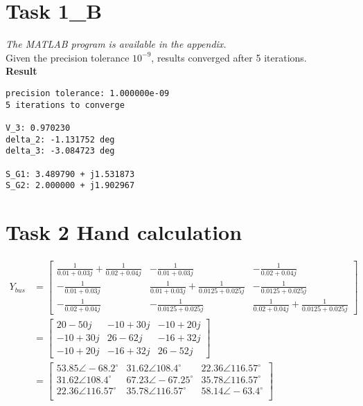 \documentclass{article}
\begin{document}
\newpage


\section*{Task 1\_B}
\textit{The MATLAB program is available in the appendix.}\\

Given the precision tolerance $10^{-9}$, results converged after 5 iterations.\\

\textbf{Result}
\begin{lstlisting}[language={}]
precision tolerance: 1.000000e-09
5 iterations to converge

V_3: 0.970230
delta_2: -1.131752 deg
delta_3: -3.084723 deg

S_G1: 3.489790 + j1.531873
S_G2: 2.000000 + j1.902967
\end{lstlisting}


\section*{Task 2 Hand calculation}

\begin{align*}
Y_{bus} &= 
\begin{bmatrix}
\frac{1}{0.01+0.03j} + \frac{1}{0.02+0.04j} &-\frac{1}{0.01+0.03j} &-\frac{1}{0.02+0.04j}\\
-\frac{1}{0.01+0.03j} &\frac{1}{0.01+0.03j} + \frac{1}{0.0125+0.025j} &-\frac{1}{0.0125+0.025j}\\
-\frac{1}{0.02+0.04j} &-\frac{1}{0.0125+0.025j} &\frac{1}{0.02+0.04j} + \frac{1}{0.0125+0.025j}
\end{bmatrix}\\
&=
\begin{bmatrix}
20-50j &-10+30j &-10+20j\\
-10+30j &26-62j &-16+32j\\
-10+20j &-16+32j &26-52j
\end{bmatrix}\\
&=
\begin{bmatrix}
53.85 \angle -68.2^{\circ} &31.62 \angle 108.4^{\circ} &22.36 \angle 116.57^{\circ}\\
31.62 \angle 108.4^{\circ} &67.23 \angle -67.25^{\circ} &35.78 \angle 116.57^{\circ}\\
22.36 \angle 116.57^{\circ} &35.78 \angle 116.57^{\circ} &58.14 \angle -63.4^{\circ}\\
\end{bmatrix}
\end{align*}
\end{document}
